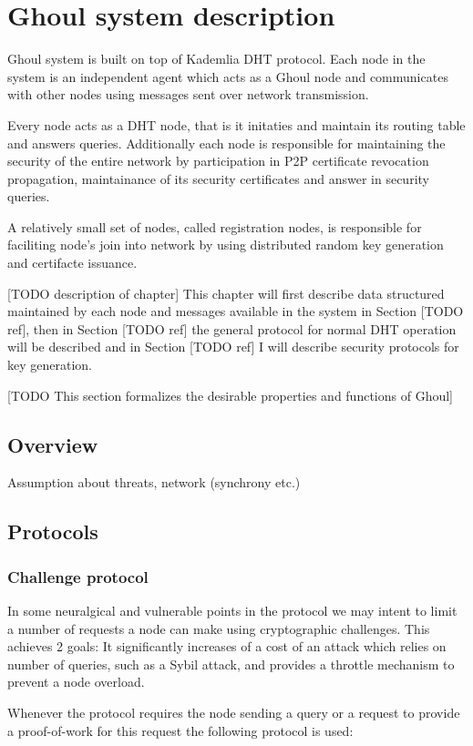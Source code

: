 \chapter{Ghoul system description}
Ghoul system is built on top of Kademlia DHT protocol. Each node in the system
is an independent agent which acts as a Ghoul node and communicates with other
nodes using messages sent over network transmission. 

Every node acts as a DHT node, that is it initaties and maintain its routing
table and answers queries. Additionally each node is responsible for maintaining
the security of the entire network by participation in P2P certificate
revocation propagation, maintainance of its security certificates and answer in
security queries.

A relatively small set of nodes, called registration nodes, is responsible for
faciliting node's join into network by using distributed random key generation
and certifacte issuance.

[TODO description of chapter]
This chapter will first describe data structured maintained by each node and
messages available in the system in Section [TODO ref], then in Section [TODO ref]
the general protocol for normal DHT operation will be described and in Section
[TODO ref] I will describe security protocols for key generation.

[TODO This section formalizes the desirable properties and functions of Ghoul]

\section{Overview}
Assumption about threats, network (synchrony etc.)

\section{Protocols}
\subsection{Challenge protocol}
In some neuralgical and vulnerable points in the protocol we may intent to limit
a number of requests a node can make using cryptographic challenges. This
achieves 2 goals: It significantly increases of a cost of an attack which relies
on number of queries, such as a Sybil attack, and provides a throttle mechanism
to prevent a node overload.

Whenever the protocol requires the node sending a query or a request to provide
a proof-of-work for this request the following protocol is used:


